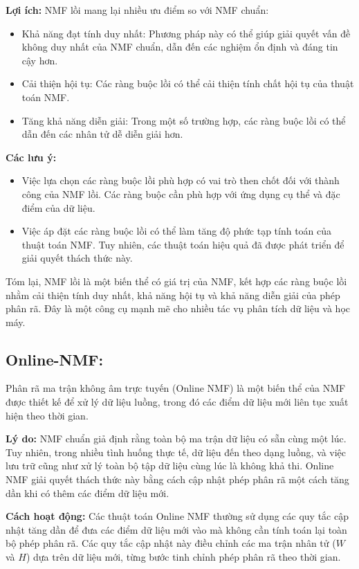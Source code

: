 \textbf{Lợi ích:} NMF lồi mang lại nhiều ưu điểm so với NMF chuẩn:

\begin{itemize}
\item
  Khả năng đạt tính duy nhất: Phương pháp này có thể giúp giải quyết vấn đề không duy nhất của NMF chuẩn, dẫn đến các nghiệm ổn định và đáng tin cậy hơn.
\item
  Cải thiện hội tụ: Các ràng buộc lồi có thể cải thiện tính chất hội tụ của thuật toán NMF.
\item
  Tăng khả năng diễn giải: Trong một số trường hợp, các ràng buộc lồi có thể dẫn đến các nhân tử dễ diễn giải hơn.
\end{itemize}

\textbf{Các lưu ý:}

\begin{itemize}
\item
  Việc lựa chọn các ràng buộc lồi phù hợp có vai trò then chốt đối với thành công của NMF lồi. Các ràng buộc cần phù hợp với ứng dụng cụ thể và đặc điểm của dữ liệu.
\item
  Việc áp đặt các ràng buộc lồi có thể làm tăng độ phức tạp tính toán của thuật toán NMF. Tuy nhiên, các thuật toán hiệu quả đã được phát triển để giải quyết thách thức này.
\end{itemize}

Tóm lại, NMF lồi là một biến thể có giá trị của NMF, kết hợp các ràng buộc lồi nhằm cải thiện tính duy nhất, khả năng hội tụ và khả năng diễn giải của phép phân rã. Đây là một công cụ mạnh mẽ cho nhiều tác vụ phân tích dữ liệu và học máy.

\subsection{Online-NMF:}

Phân rã ma trận không âm trực tuyến (Online NMF) là một biến thể của NMF được thiết kế để xử lý dữ liệu luồng, trong đó các điểm dữ liệu mới liên tục xuất hiện theo thời gian.

\textbf{Lý do:} NMF chuẩn giả định rằng toàn bộ ma trận dữ liệu có sẵn cùng một lúc. Tuy nhiên, trong nhiều tình huống thực tế, dữ liệu đến theo dạng luồng, và việc lưu trữ cũng như xử lý toàn bộ tập dữ liệu cùng lúc là không khả thi. Online NMF giải quyết thách thức này bằng cách cập nhật phép phân rã một cách tăng dần khi có thêm các điểm dữ liệu mới.

\textbf{Cách hoạt động:} Các thuật toán Online NMF thường sử dụng các quy tắc cập nhật tăng dần để đưa các điểm dữ liệu mới vào mà không cần tính toán lại toàn bộ phép phân rã. Các quy tắc cập nhật này điều chỉnh các ma trận nhân tử (\(W\) và \(H\)) dựa trên dữ liệu mới, từng bước tinh chỉnh phép phân rã theo thời gian.

